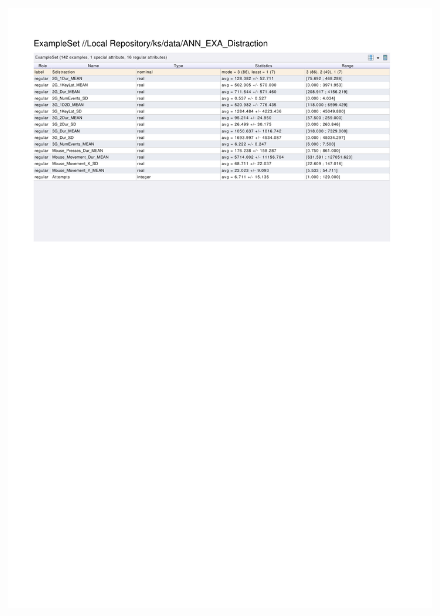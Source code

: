 \begin{figure}[htp]
  \centerline{\includegraphics[trim=0 590 0 60,clip,width=16.09cm]{results/ANN_EXA_Distraction.pdf}} \caption{
} \label{ANN_EXA_Distraction}
\end{figure}

